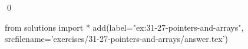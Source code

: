 
\begin{ex}
  \label{ex:31-27-pointers-and-arrays}
  
  \qed
\end{ex}
\begin{python0}
from solutions import *
add(label="ex:31-27-pointers-and-arrays",
    srcfilename='exercises/31-27-pointers-and-arrays/answer.tex')
\end{python0}
